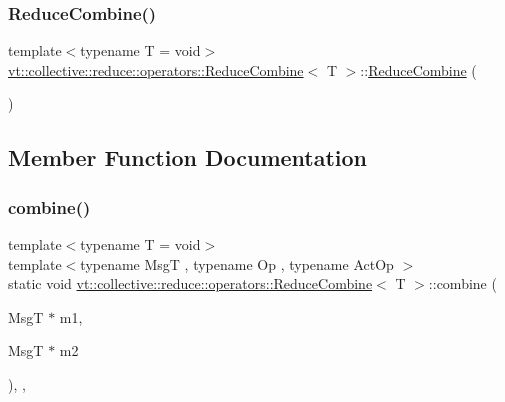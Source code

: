 \subsubsection{\texorpdfstring{Reduce\+Combine()}{ReduceCombine()}}
{\footnotesize\ttfamily template$<$typename T = void$>$ \\
\hyperlink{structvt_1_1collective_1_1reduce_1_1operators_1_1_reduce_combine}{vt\+::collective\+::reduce\+::operators\+::\+Reduce\+Combine}$<$ T $>$\+::\hyperlink{structvt_1_1collective_1_1reduce_1_1operators_1_1_reduce_combine}{Reduce\+Combine} (\begin{DoxyParamCaption}{ }\end{DoxyParamCaption})\hspace{0.3cm}{\ttfamily [default]}}



\subsection{Member Function Documentation}
\mbox{\label{structvt_1_1collective_1_1reduce_1_1operators_1_1_reduce_combine_a3ac102a9f02db3a907e35607f537407b}} 
\subsubsection{\texorpdfstring{combine()}{combine()}}
{\footnotesize\ttfamily template$<$typename T = void$>$ \\
template$<$typename MsgT , typename Op , typename Act\+Op $>$ \\
static void \hyperlink{structvt_1_1collective_1_1reduce_1_1operators_1_1_reduce_combine}{vt\+::collective\+::reduce\+::operators\+::\+Reduce\+Combine}$<$ T $>$\+::combine (\begin{DoxyParamCaption}\item[{MsgT $\ast$}]{m1,  }\item[{MsgT $\ast$}]{m2 }\end{DoxyParamCaption})\hspace{0.3cm}{\ttfamily [inline]}, {\ttfamily [static]}, {\ttfamily [private]}}

